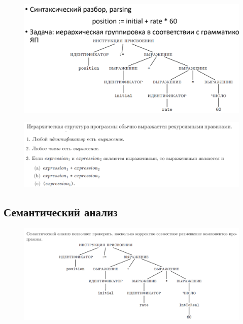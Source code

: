 \documentclass{article}
\begin{document}
\begin{figure}[H]
    \centering
    \includegraphics[width=1\linewidth]{Снимок экрана 2025-02-13 091654.png}
\end{figure}

\begin{figure}[H]
    \centering
    \includegraphics[width=1\linewidth]{Снимок экрана 2025-02-13 091754.png}
    \end{figure}
    
    \subsection{Семантический анализ}
    
\begin{figure}[H]
    \centering
    \includegraphics[width=1\linewidth]{Снимок экрана 2025-02-13 091809.png}
\end{figure}
\end{document}
